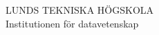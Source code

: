 \vspace*{-10mm}
\noindent LUNDS TEKNISKA HÖGSKOLA\hfill \cscourse \\[-2pt]
Institutionen för datavetenskap \hfill \csyear \\
